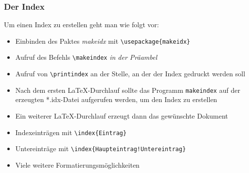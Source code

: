 \begin{frame}[fragile]
  \frametitle{Der Index}

  \onslide<+->

  Um einen Index zu erstellen geht man wie folgt vor:
  \begin{itemize}
  \item Einbinden des Paktes \textit{makeidx} mit \lstinline!\usepackage{makeidx}!
  \item Aufruf des Befehls \lstinline{\makeindex} \textit{in der Präambel}
  \item Aufruf von \lstinline!\printindex! an der Stelle, an der der Index gedruckt werden
    soll
  \end{itemize}

  \onslide<+->

  \begin{itemize}
  \item Nach dem ersten \LaTeX-Durchlauf sollte das Programm \texttt{makeindex}
    auf der erzeugten *.idx-Datei aufgerufen werden, um den Index zu erstellen
  \item Ein weiterer \LaTeX-Durchlauf erzeugt dann das gewünschte Dokument
  \end{itemize}

  \onslide<+->

  \begin{itemize}
  \item Indexeinträgen mit \lstinline!\index{Eintrag}!
  \item Untereinträge mit \lstinline?\index{Haupteintrag!Untereintrag}?
  \item Viele weitere Formatierungsmöglichkeiten
  \end{itemize}

\end{frame}




